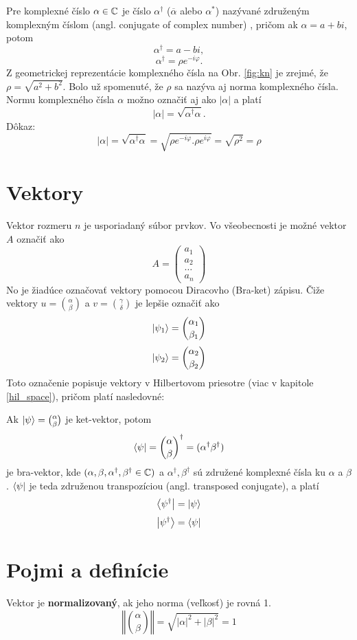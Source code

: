 Pre komplexné číslo \(\alpha \in \mathbb{C}\) je číslo \(\alpha^{\dag}\) (\(\overline{\alpha}\) alebo \(\alpha^{*}\)) nazývané združeným komplexným číslom (angl. conjugate of complex number) \cite{Tit06}, pričom ak \(\alpha = a + bi\), potom 
\[\alpha^{\dag} = a - bi,\] 
\[\alpha^{\dag} = \rho e^{-i\varphi}.\]
Z geometrickej reprezentácie komplexného čísla na Obr. \ref{fig:kn} je zrejmé, že \(\rho = \sqrt{a^2 + b^2}\).
Bolo už spomenuté, že \(\rho\) sa nazýva aj norma komplexného čísla.
Normu komplexného čísla \(\alpha\) možno označiť aj ako \(|\alpha|\) a platí
\[|\alpha| = \sqrt{\alpha^{\dag}\alpha}.\]
Dôkaz:
\[|\alpha| = \sqrt{\alpha^{\dag}\alpha} = \sqrt{\rho e^{-i\varphi}.\rho e^{i\varphi}} = \sqrt{\rho^{2}} = \rho\]

\section{Vektory}
\label{vektory}

Vektor rozmeru \(n\) je usporiadaný súbor prvkov.
Vo všeobecnosti je možné vektor \(A\) označiť ako 
\[A = \begin{pmatrix}
		a_{1} \\
		a_{2}\\
		\dots \\
		a_{n}
     \end{pmatrix}\]
No je žiadúce označovať vektory pomocou Diracovho (Bra-ket) zápisu.
Čiže vektory \(u = \binom{\alpha}{\beta}\) a \(v = \binom{\gamma}{\delta}\) je lepšie označiť ako 
\[\Ket{\psi_1} = \binom{\alpha_1}{\beta_1}\]
\[\Ket{\psi_2} = \binom{\alpha_2}{\beta_2}\]
Toto označenie popisuje vektory v Hilbertovom priesotre (viac v kapitole \ref{hil_space}), pričom platí nasledovné:

Ak \(\Ket{\psi} = \binom{\alpha}{\beta}\) je ket-vektor, potom 
\[\Bra{\psi} = {\binom{\alpha}{\beta}}^{\dag} = (\alpha^{\dag} \beta^{\dag})\]
je  bra-vektor, kde \( ( \alpha, \beta, \alpha^{\dag}, \beta^{\dag} \in \mathbb{C} ) \) a \(\alpha^{\dag}, \beta^{\dag}\) sú združené komplexné čísla ku \(\alpha\) a \(\beta\).
\(\Bra{\psi}\) je teda združenou transpozíciou (angl. transposed conjugate), a platí
\[\Bra{\psi^{\dag}} = \Ket{\psi}\]
\[\Ket{\psi^{\dag}} = \Bra{\psi}\]


\section{Pojmi a definície}
Vektor je \textbf{normalizovaný}, ak jeho norma (veľkosť) je rovná 1.
\[\left\Vert \binom{\alpha}{\beta} \right\Vert = \sqrt{|\alpha|^2 + |\beta|^2}= 1\]

